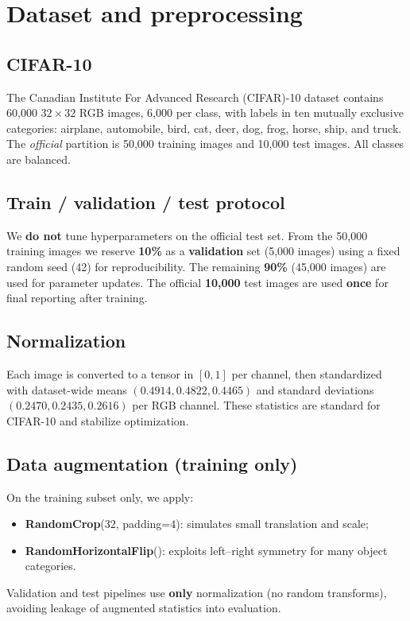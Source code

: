 \documentclass[11pt,a4paper]{article}
\begin{document}
\section{Dataset and preprocessing}
\label{sec:dataset}

\subsection{CIFAR-10}
The Canadian Institute For Advanced Research (CIFAR)-10 dataset contains 60{,}000 $32\times 32$ RGB images, 6{,}000 per class, with labels in ten mutually exclusive categories: airplane, automobile, bird, cat, deer, dog, frog, horse, ship, and truck. The \emph{official} partition is 50{,}000 training images and 10{,}000 test images. All classes are balanced.

\subsection{Train / validation / test protocol}
We \textbf{do not} tune hyperparameters on the official test set. From the 50{,}000 training images we reserve \textbf{10\%} as a \textbf{validation} set (5{,}000 images) using a fixed random seed (42) for reproducibility. The remaining \textbf{90\%} (45{,}000 images) are used for parameter updates. The official \textbf{10{,}000} test images are used \textbf{once} for final reporting after training.

\subsection{Normalization}
Each image is converted to a tensor in $[0,1]$ per channel, then standardized with dataset-wide means $(0.4914, 0.4822, 0.4465)$ and standard deviations $(0.2470, 0.2435, 0.2616)$ per RGB channel. These statistics are standard for CIFAR-10 and stabilize optimization.

\subsection{Data augmentation (training only)}
On the training subset only, we apply:
\begin{itemize}[noitemsep]
  \item \textbf{RandomCrop}($32$, padding=$4$): simulates small translation and scale;
  \item \textbf{RandomHorizontalFlip}(): exploits left--right symmetry for many object categories.
\end{itemize}
Validation and test pipelines use \textbf{only} normalization (no random transforms), avoiding leakage of augmented statistics into evaluation.
\end{document}
